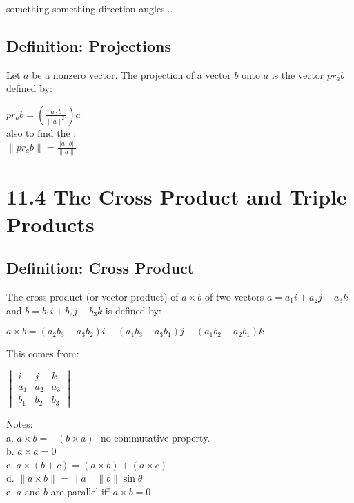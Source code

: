 \documentclass{article} %
\begin{document}
    something something direction angles...\\

    \subsection*{Definition: Projections}
    Let $a$ be a nonzero vector. The projection of a vector $b$ onto $a$ is the vector $pr_ab$ defined by:
    \begin{center}
        $pr_ab = (\frac{a\cdot b}{\|a\|^2})a$\\
        also to find the :\\
        $\|pr_ab\|=\frac{|a\cdot b|}{\|a\|}$
        
        
    \end{center}

    \section*{11.4 The Cross Product and Triple Products}
    \subsection*{Definition: Cross Product}
    The cross product (or vector product) of $a\times b$ of two vectors $a = a_1i+a_2j+a_3k$
    and $b = b_1i+b_2j+b_3k$ is defined by:
    \begin{center}
        $a \times b = (a_2b_3-a_3b_2)i-(a_1b_3-a_3b_1)j+(a_1b_2-a_2b_1)k$
    \end{center}
    This comes from:
    \begin{center}
        $
        \begin{vmatrix}
            
            
            i & j & k\\
            a_1 & a_2 & a_3\\
            b_1 & b_2 & b_3
        \end{vmatrix}
        $
    \end{center}
    
    Notes:\\
    a. $a \times b = -(b \times a)$ -no commutative property.\\
    b. $a\times a = 0$\\
    c. $a \times (b+c) = (a \times b)+(a \times c)$\\
    d. $\| a \times b \| = \|a\|\|b\|\sin\theta$\\
    e. $a$ and $b$ are parallel iff $a\times b = 0$\\
    
\end{document}
